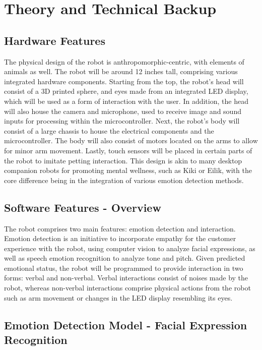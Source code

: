 \section{Theory and Technical Backup}

\subsection{Hardware Features}

The physical design of the robot is anthropomorphic-centric, with elements of animals as well. The robot will be around 12 inches tall, comprising various integrated hardware components. Starting from the top, the robot’s head will consist of a 3D printed sphere, and eyes made from an integrated LED display, which will be used as a form of interaction with the user. In addition, the head will also house the camera and microphone, used to receive image and sound inputs for processing within the microcontroller. Next, the robot’s body will consist of a large chassis to house the electrical components and the microcontroller. The body will also consist of motors located on the arms to allow for minor arm movement. Lastly, touch sensors will be placed in certain parts of the robot to imitate petting interaction. This design is akin to many desktop companion robots for promoting mental wellness, such as Kiki or Eilik, with the core difference being in the integration of various emotion detection methods.

\subsection{Software Features - Overview}

The robot comprises two main features: emotion detection and interaction. Emotion detection is an initiative to incorporate empathy for the customer experience with the robot, using computer vision to analyze facial expressions, as well as speech emotion recognition to analyze tone and pitch. Given predicted emotional status, the robot will be programmed to provide interaction in two forms: verbal and non-verbal. Verbal interactions consist of noises made by the robot, whereas non-verbal interactions comprise physical actions from the robot such as arm movement or changes in the LED display resembling its eyes.

\subsection{Emotion Detection Model - Facial Expression Recognition}

